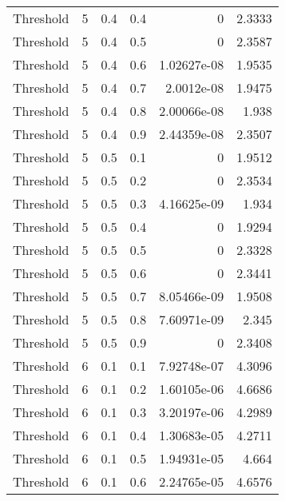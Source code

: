 \documentclass{article}
\begin{document}
\begin{longtable}[H]{lrrrrr}
 Threshold      &       5 &   0.4 &            0.4 &   0           &          2.3333 \\
 Threshold      &       5 &   0.4 &            0.5 &   0           &          2.3587 \\
 Threshold      &       5 &   0.4 &            0.6 &   1.02627e-08 &          1.9535 \\
 Threshold      &       5 &   0.4 &            0.7 &   2.0012e-08  &          1.9475 \\
 Threshold      &       5 &   0.4 &            0.8 &   2.00066e-08 &          1.938  \\
 Threshold      &       5 &   0.4 &            0.9 &   2.44359e-08 &          2.3507 \\
 Threshold      &       5 &   0.5 &            0.1 &   0           &          1.9512 \\
 Threshold      &       5 &   0.5 &            0.2 &   0           &          2.3534 \\
 Threshold      &       5 &   0.5 &            0.3 &   4.16625e-09 &          1.934  \\
 Threshold      &       5 &   0.5 &            0.4 &   0           &          1.9294 \\
 Threshold      &       5 &   0.5 &            0.5 &   0           &          2.3328 \\
 Threshold      &       5 &   0.5 &            0.6 &   0           &          2.3441 \\
 Threshold      &       5 &   0.5 &            0.7 &   8.05466e-09 &          1.9508 \\
 Threshold      &       5 &   0.5 &            0.8 &   7.60971e-09 &          2.345  \\
 Threshold      &       5 &   0.5 &            0.9 &   0           &          2.3408 \\
 Threshold      &       6 &   0.1 &            0.1 &   7.92748e-07 &          4.3096 \\
 Threshold      &       6 &   0.1 &            0.2 &   1.60105e-06 &          4.6686 \\
 Threshold      &       6 &   0.1 &            0.3 &   3.20197e-06 &          4.2989 \\
 Threshold      &       6 &   0.1 &            0.4 &   1.30683e-05 &          4.2711 \\
 Threshold      &       6 &   0.1 &            0.5 &   1.94931e-05 &          4.664  \\
 Threshold      &       6 &   0.1 &            0.6 &   2.24765e-05 &          4.6576 \\

\end{longtable}
\end{document}
